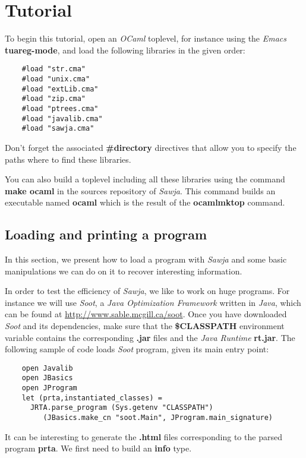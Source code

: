 \documentclass{article}
\begin{document}
\section{Tutorial}

To begin this tutorial, open an \emph{OCaml} toplevel, for instance
using the \emph{Emacs} \textbf{tuareg-mode}, and load the following
libraries in the given order:

\begin{verbatim}
    #load "str.cma"
    #load "unix.cma"
    #load "extLib.cma"
    #load "zip.cma"
    #load "ptrees.cma"
    #load "javalib.cma"
    #load "sawja.cma"
\end{verbatim}
Don't forget the associated \textbf{\#directory} directives that
allow you to specify the paths where to find these libraries.

You can also build a toplevel including all these libraries using
the command \textbf{make ocaml} in the sources repository of
\emph{Sawja}. This command builds an executable named
\textbf{ocaml} which is the result of the \textbf{ocamlmktop}
command.

\subsection{Loading and printing a program}

In this section, we present how to load a program with \emph{Sawja}
and some basic manipulations we can do on it to recover interesting
information.

In order to test the efficiency of \emph{Sawja}, we like to work on
huge programs. For instance we will use \emph{Soot}, a
\emph{Java Optimization Framework} written in \emph{Java}, which
can be found at
\href{http://www.sable.mcgill.ca/soot}{http://www.sable.mcgill.ca/soot}.
Once you have downloaded \emph{Soot} and its dependencies, make
sure that the \textbf{\$CLASSPATH} environment variable contains
the corresponding \textbf{.jar} files and the \emph{Java Runtime}
\textbf{rt.jar}. The following sample of code loads \emph{Soot}
program, given its main entry point:

\begin{verbatim}
    open Javalib
    open JBasics
    open JProgram
    let (prta,instantiated_classes) =
      JRTA.parse_program (Sys.getenv "CLASSPATH")
         (JBasics.make_cn "soot.Main", JProgram.main_signature)
\end{verbatim}
It can be interesting to generate the \textbf{.html} files
corresponding to the parsed program \textbf{prta}. We first need to
build an \textbf{info} type.
\end{document}
